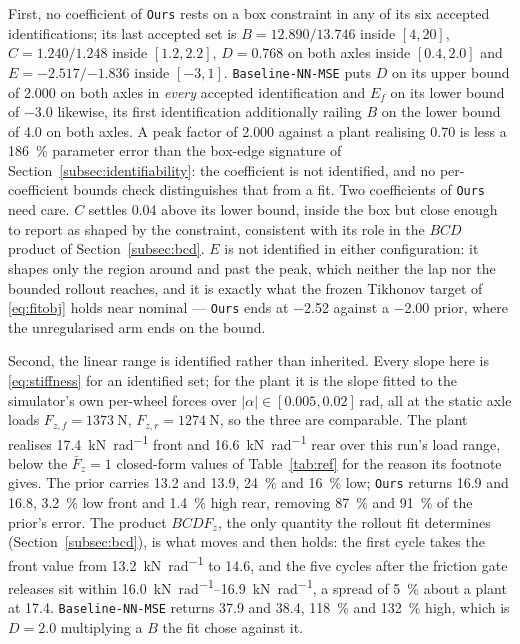 First, no coefficient of \texttt{Ours} rests on a box constraint in any of its
six accepted identifications; its last accepted set is
$B=\num{12.890}/\num{13.746}$ inside $[4,20]$,
$C=\num{1.240}/\num{1.248}$ inside $[1.2,2.2]$, $D=\num{0.768}$ on both axles
inside $[0.4,2.0]$ and $E=\num{-2.517}/\num{-1.836}$ inside $[-3,1]$.
\texttt{Baseline-NN-MSE} puts $D$ on its upper bound of \num{2.000} on both
axles in \emph{every} accepted identification and $E_{f}$ on its lower bound of
\num{-3.0} likewise, its first identification additionally railing $B$ on the
lower bound of \num{4.0} on both axles. A peak factor of \num{2.000} against a
plant realising \num{0.70} is less a \SI{186}{\percent} parameter error than
the box-edge signature of Section~\ref{subsec:identifiability}: the coefficient
is not identified, and no per-coefficient bounds check distinguishes that from
a fit. Two coefficients of \texttt{Ours} need care. $C$ settles \num{0.04}
above its lower bound, inside the box but close enough to report as shaped by
the constraint, consistent with its role in the $BCD$ product of
Section~\ref{subsec:bcd}. $E$ is not identified in either configuration: it
shapes only the region around and past the peak, which neither the lap nor the
bounded rollout reaches, and it is exactly what the frozen Tikhonov target of
\eqref{eq:fitobj} holds near nominal --- \texttt{Ours} ends at \num{-2.52}
against a \num{-2.00} prior, where the unregularised arm ends on the bound.

Second, the linear range is identified rather than inherited. Every slope here
is \eqref{eq:stiffness} for an identified set; for the plant it is the slope
fitted to the simulator's own per-wheel forces over
$|\alpha|\in[\num{0.005},\num{0.02}]\,\si{\radian}$, all at the static axle
loads $F_{z,f}=\SI{1373}{\newton}$, $F_{z,r}=\SI{1274}{\newton}$, so the three
are comparable. The plant realises \SI{17.4}{\kilo\newton\per\radian} front and
\SI{16.6}{\kilo\newton\per\radian} rear over this run's load range, below the
$\bar F_{z}=1$ closed-form values of Table~\ref{tab:ref} for the reason its
footnote gives. The prior carries \num{13.2} and \num{13.9},
\SI{24}{\percent} and \SI{16}{\percent} low; \texttt{Ours} returns \num{16.9}
and \num{16.8}, \SI{3.2}{\percent} low front and \SI{1.4}{\percent} high rear,
removing \SI{87}{\percent} and \SI{91}{\percent} of the prior's error. The
product $BCDF_{z}$, the only quantity the rollout fit determines
(Section~\ref{subsec:bcd}), is what moves and then holds: the first cycle takes
the front value from \SI{13.2}{\kilo\newton\per\radian} to \num{14.6}, and the
five cycles after the friction gate releases sit within
\SIrange{16.0}{16.9}{\kilo\newton\per\radian}, a spread of \SI{5}{\percent}
about a plant at \num{17.4}. \texttt{Baseline-NN-MSE} returns \num{37.9} and
\num{38.4}, \SI{118}{\percent} and \SI{132}{\percent} high, which is
$D=\num{2.0}$ multiplying a $B$ the fit chose against it.

